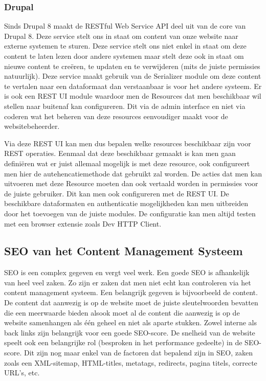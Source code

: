 \subsubsection{Drupal}
Sinds Drupal 8 maakt de RESTful Web Service API deel uit van de core van Drupal 8. Deze service stelt ons in staat om content van onze website naar externe systemen te sturen. Deze service stelt ons niet enkel in staat om deze content te laten lezen door andere systemen maar stelt deze ook in staat om nieuwe content te creëren, te updaten en te verwijderen (mits de juiste permissies natuurlijk). Deze service maakt gebruik van de Serializer module om deze content te vertalen naar een dataformaat dan verstaanbaar is voor het andere systeem. Er is ook een REST UI module waardoor men de Resources dat men beschikbaar wil stellen naar buitenaf kan configureren. Dit via de admin interface en niet via coderen wat het beheren van deze resources eenvoudiger maakt voor de websitebeheerder.

Via deze REST UI kan men dus bepalen welke resources beschikbaar zijn voor REST operaties. Eenmaal dat deze beschikbaar gemaakt is kan men gaan definiëren wat er juist allemaal mogelijk is met deze resource, ook configureert men hier de autehencatiemethode dat gebruikt zal worden. De acties dat men kan uitvoeren met deze Resource moeten dan ook vertaald worden in permissies voor de juiste gebruiker. Dit kan men ook configureren met de REST UI. De beschikbare dataformaten en authenticatie mogelijkheden kan men uitbreiden door het toevoegen van de juiste modules. De configuratie kan men altijd testen met een browser extensie zoals Dev HTTP Client.

\subsection{SEO van het Content Management Systeem}
SEO is een complex gegeven en vergt veel werk. Een goede SEO is afhankelijk van heel veel zaken. Zo zijn er zaken dat men niet echt kan controleren via het content management systeem. Een belangrijk gegeven is bijvoorbeeld de content. De content dat aanwezig is op de website moet de juiste sleutelwoorden bevatten die een meerwaarde bieden alsook moet al de content die aanwezig is op de website samenhangen als één geheel en niet als aparte stukken. Zowel interne als back links zijn belangrijk voor een goede SEO-score. De snelheid van de website speelt ook een belangrijke rol (besproken in het performance gedeelte) in de SEO-score. Dit zijn nog maar enkel van de factoren dat bepalend zijn in SEO, zaken zoals een XML-sitemap, HTML-titles, metatags, redirects, pagina titels, correcte URL's, etc.

